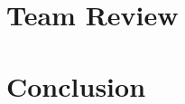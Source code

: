 \documentclass[10pt,letterpaper,onecolumn,draftclsnofoot,journal]{IEEEtran}
\begin{document}
\section{Team Review}

\section{Conclusion}

\clearpage

\vspace{1in}
\end{document}
